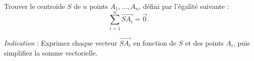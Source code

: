 Trouver le centroïde $S$ de $n$ points $A_1, \ldots, A_n$, défini par
l'égalité suivante :
\[
\sum_{i=1}^{n} \overrightarrow{SA_i} = \overrightarrow{0}.
\]

\emph{Indication} : Exprimez chaque vecteur $\overrightarrow{SA_i}$ en
fonction de $S$ et des points $A_i$, puis simplifiez la somme vectorielle.
